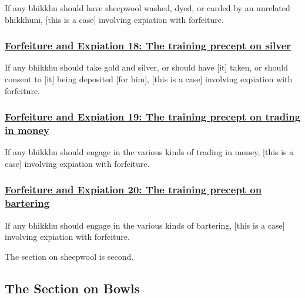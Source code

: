 If any bhikkhu should have sheepwool washed, dyed, or carded by an unrelated bhikkhunī, [this is a case] involving expiation with forfeiture.



\subsubsection*{\hyperref[np18]{Forfeiture and Expiation 18: The training precept on silver}}
\label{forf-exp18}

If any bhikkhu should take gold and silver, or should have [it] taken, or should consent to [it] being deposited [for him], [this is a case] involving expiation with forfeiture.



\subsubsection*{\hyperref[np19]{Forfeiture and Expiation 19: The training precept on trading in money}}
\label{forf-exp19}

If any bhikkhu should engage in the various kinds of trading in money, [this is a case] involving expiation with forfeiture.



\subsubsection*{\hyperref[np20]{Forfeiture and Expiation 20: The training precept on bartering}}
\label{forf-exp20}

If any bhikkhu should engage in the various kinds of bartering, [this is a case] involving expiation with forfeiture.

\begin{center}
The section on sheepwool is second.
\end{center}



\setsubsecheadstyle{\subsectionFmt}
\subsection{The Section on Bowls}
\label{forf-exp-vagga3}


